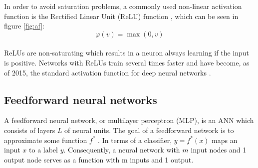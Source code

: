 In order to avoid saturation problems, a commonly used non-linear activation function is the Rectified Linear Unit (ReLU) function \cite{Nair:2010:RLU:3104322.3104425}, which can be seen in figure \ref{fig:af}:\\

\begin{equation}
  \varphi(v) = \max(0, v)
\end{equation}
\\
ReLUs are non-saturating which results in a neuron always learning if the input is positive. Networks with ReLUs train several times faster and have become, as of 2015, the standard activation function for deep neural networks \cite{lecun2015deep}.

\subsection{Feedforward neural networks}
A feedforward neural network, or multilayer perceptron (MLP), is an ANN which consists of layers $L$ of neural units. The goal of a feedforward network is to approximate some function $f^*$ \cite{Goodfellow-et-al-2016}. In terms of a classifier, $y=f^*(x)$ maps an input $x$ to a label $y$. Consequently, a neural network with $m$ input nodes and 1 output node serves as a function with m inputs and 1 output.

